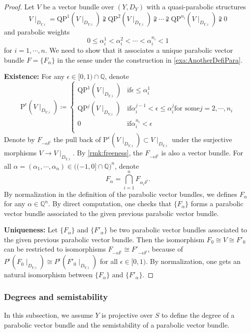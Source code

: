 \documentclass[12pt,twoside]{book}
\theoremstyle{plain}
\theoremstyle{definition}
\theoremstyle{remark}
\newcommand{\bQ}{{\mathbb Q}}
\numberwithin{equation}{section}
\def\QP{{\mathrm{QP}}}
\def\P{{\mathrm{P}}}
\begin{document}
\begin{proof}
Let $V$ be a vector bundle over $(Y,D_Y)$ with a quasi-parabolic structures
\[V\mid_{D_{Y,i}} = \QP^1(V\mid_{D_{Y,i}}) \supsetneqq \QP^2(V\mid_{D_{Y,i}}) \supsetneqq \cdots \supsetneqq \QP^{n_i}(V\mid_{D_{Y,i}}) \supsetneqq 0\]
and parabolic weights
\[0\leq\alpha_i^1<\alpha_i^2<\cdots<\alpha_i^{n_i}<1\]
for $i=1,\cdots,n$.
We need to show that it associates a unique parabolic vector bundle $F=\{F_\alpha\}$ in the sense under the construction in \autoref{exa:AnotherDefiPara}.

\textbf{Existence:} For any $\epsilon\in [0,1)\cap\bQ$, denote
\[\P^\epsilon(V\mid_{D_{Y,i}}) \coloneqq \left\{
\begin{array}{ll}
\QP^1(V\mid_{D_{Y,i}}) & \text{if} \epsilon \leq \alpha_i^1 \\
\QP^j(V\mid_{D_{Y,i}}) & \text{if} \alpha_{i}^{j-1} < \epsilon \leq \alpha_i^j \text{for some} j=2,\cdots,n_i\\
0 & \text{if} \alpha_{i}^{n_i} < \epsilon \\
\end{array}\right.\]
Denote by $F_{-\epsilon \delta^i}$ the pull back of $\P^\epsilon(V\mid_{D_{Y,i}})\subset V\mid_{D_{Y,i}}$ under the surjective morphisms $V\rightarrow V\mid_{D_{Y,i}}$. By \autoref{rmk:freeness}, the $F_{-\epsilon \delta^i}$ is also a vector bundle. For all $\alpha=(\alpha_1,\cdots,\alpha_n)\in \Big((-1,0]\cap\bQ\Big)^n$, denote
\[F_\alpha = \bigcap_{i=1}^n F_{\alpha_i \delta^i}.\]
By normalization in the definition of the parabolic vector bundles, we defines $F_{\alpha}$ for any $\alpha\in\bQ^n$.
By direct computation, one checks that $\{F_\alpha\}$ forms a parabolic vector bundle associated to the given previous parabolic vector bundle.

\textbf{Uniqueness:} Let $\{F_\alpha\}$ and $\{F'_\alpha\}$ be two parabolic vector bundles associated to the given previous parabolic vector bundle. Then the isomorphism $F_0\cong V\cong F'_0$ can be restricted to isomorphisms $F_{-\epsilon \delta^i} \cong F'_{-\epsilon \delta^i}$, because of $P^\epsilon(F_0\mid_{D_{Y,i}}) \cong P^\epsilon(F'_0\mid_{D_{Y,i}})$ for all $\epsilon\in[0,1)$. By normalization, one gets an natural isomorphism between $\{F_\alpha\}$ and $\{F'_\alpha\}$.
\end{proof}


\subsubsection{Degrees and semistability}
In this subsection, we assume $Y$ is projective over $S$ to define the degree of a parabolic vector bundle and the semistability of a parabolic vector bundle.
\end{document}
